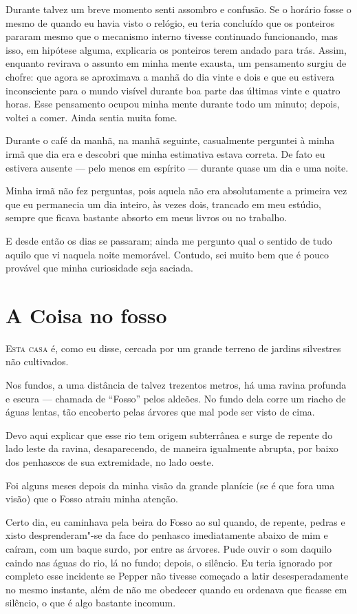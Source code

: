 Durante talvez um breve momento senti assombro e confusão. Se o horário fosse o mesmo de quando eu havia visto o
relógio, eu teria concluído que os ponteiros pararam mesmo que o mecanismo interno tivesse continuado funcionando, mas
isso, em hipótese alguma, explicaria os ponteiros terem andado para trás. Assim, enquanto revirava o assunto em minha
mente exausta, um pensamento surgiu de chofre: que agora se aproximava a manhã do dia vinte e dois e que eu estivera
inconsciente para o mundo visível durante boa parte das últimas vinte e quatro horas. Esse pensamento ocupou minha
mente durante todo um minuto; depois, voltei a comer. Ainda sentia muita fome.

Durante o café da manhã, na manhã seguinte, casualmente perguntei à minha irmã que dia era e descobri que
minha estimativa estava correta. De fato eu estivera ausente --- pelo menos em espírito --- durante quase um dia e uma
noite.

Minha irmã não fez perguntas, pois aquela não era absolutamente a primeira vez que eu permanecia um dia inteiro, às vezes
dois, trancado em meu estúdio, sempre que ficava bastante absorto em meus livros ou no trabalho.

E desde então os dias se passaram; ainda me pergunto qual o sentido de tudo aquilo que vi naquela noite memorável.
Contudo, sei muito bem que é pouco provável que minha curiosidade seja saciada.


\clearpage

\chapter{A Coisa no fosso}

\textsc{Esta casa} é, como eu disse, cercada por um grande terreno de jardins silvestres não cultivados.

Nos fundos, a uma distância de talvez trezentos metros, há uma ravina profunda e escura --- chamada de
``Fosso'' pelos aldeões. No fundo dela corre um riacho de águas lentas, tão encoberto pelas
árvores que mal pode ser visto de cima.

Devo aqui explicar que esse rio tem origem subterrânea e surge de repente do lado leste da ravina, desaparecendo, de
maneira igualmente abrupta, por baixo dos penhascos de sua extremidade, no lado oeste.

Foi alguns meses depois da minha visão da grande planície (se é que fora uma visão) que o Fosso atraiu minha atenção.

Certo dia, eu caminhava pela beira do Fosso ao sul quando, de repente, pedras e xisto desprenderam"-se da face do
penhasco imediatamente abaixo de mim e caíram, com um baque surdo, por entre as árvores. Pude ouvir o som daquilo
caindo nas águas do rio, lá no fundo; depois, o silêncio. Eu teria ignorado por completo esse incidente se Pepper não
tivesse começado a latir desesperadamente no mesmo instante, além de não me obedecer quando eu ordenava que ficasse em
silêncio, o que é algo bastante incomum.


